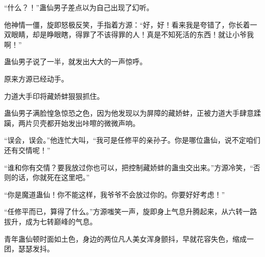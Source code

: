 \begin{this_body}
“什么？！”蛊仙男子差点以为自己出现了幻听。

他神情一僵，旋即怒极反笑，手指着方源：“好，好！看来我是夸错了，你长着一双眼睛，却是睁眼瞎，得罪了不该得罪的人！真是不知死活的东西！就让小爷我啊！”

蛊仙男子说了一半，就发出大大的一声惊呼。

原来方源已经动手。

力道大手印将藏娇蚌狠狠抓住。

蛊仙男子满脸惶急惊恐之色，因为他发现以为屏障的藏娇蚌，正被力道大手肆意蹂躏，两片贝壳都开始发出咔嚓的微微声响。

“误会，误会。”他连忙大叫，“我可是任修平的亲孙子。你是哪位蛊仙，说不定咱们还有交情呢！”

“谁和你有交情？要我放过你也可以，把控制藏娇蚌的蛊虫交出来。”方源冷笑，“否则的话，你就死在这里吧。”

“你是魔道蛊仙！你不能这样，我爷爷不会放过你的。你要好好考虑！”

“任修平而已，算得了什么。”方源嗤笑一声，旋即身上气息升腾起来，从六转一路拔升，成为七转巅峰的气息。

青年蛊仙顿时面如土色，身边的两位凡人美女浑身颤抖，早就花容失色，缩成一团，瑟瑟发抖。

\end{this_body}

